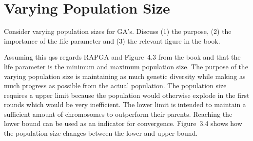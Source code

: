 \documentclass[../main.tex]{subfiles}
\begin{document}
\section{Varying Population Size}
\begin{question}
Consider varying population sizes for GA's. Discuss (1) the purpose, (2) the importance of the life parameter and (3)
the relevant figure in the book.
\end{question}
\begin{solution}
Assuming this qss regards RAPGA and Figure~4.3 from the
book \cite{affenzeller2009genetic} and that the life parameter is the minimum and maximum population size. The
purpose of the varying population size is maintaining as much genetic diversity while making as much progress as
possible from the actual population. The population size requires a upper limit because the population would
otherwise explode in the first rounds which would be very inefficient. The lower limit is intended to maintain a
sufficient amount of chromosomes to outperform their parents. Reaching the lower bound can be used as an indicator
for convergence. Figure~3.4 shows how the population size changes between the lower and upper bound.
\end{solution}
\end{document}
